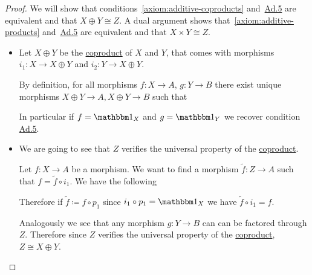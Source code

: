 \documentclass[../../main]{subfiles}
\begin{document}
\begin{proof}
  We will show that conditions~\ref{axiom:additive-coproducts} and~\hyperref[axiom:additive-morphisms]{Ad.5} are equivalent and that \(X \oplus Y \cong Z\).
  A dual argument shows that~\ref{axiom:additive-products} and~\hyperref[axiom:additive-morphisms]{Ad.5} are equivalent and that \(X \times Y \cong Z\).
  \begin{itemize}
    \item[{\ref{axiom:additive-coproducts} \(\implies\) \hyperref[axiom:additive-morphisms]{Ad.5}}] Let \(X \oplus Y\) be the \hyperref[def:categorical-coproduct]{coproduct} of \(X\) and \(Y\), that comes with morphisms \(i_{1}\colon X \to X \oplus Y\) and \(i_{2}\colon Y \to X \oplus Y\).

          By definition, for all morphisms \(f\colon X \to A\), \(g\colon Y \to B\) there exist unique morphisms \(X \oplus Y \to A, X \oplus Y \to B\) such that
          \begin{center}
          \end{center}
          In particular if \(f = \id_{X}\) and \(g = \id_{Y}\) we recover condition \hyperref[axiom:additive-morphisms]{Ad.5}.
    \item[{\hyperref[axiom:additive-morphisms]{Ad.5} \(\implies\) \ref{axiom:additive-coproducts}}] We are going to see that \(Z\) verifies the universal property of the \hyperref[def:categorical-coproduct]{coproduct}.

          Let \(f: X \to A\) be a morphism. We want to find a morphism \(\widetilde{f}\colon Z \to A\) such that \(f = \widetilde{f} \circ i_{1}\).
          We have the following
          \begin{center}
          \end{center}
          Therefore if \(\widetilde{f} \coloneq f \circ p_{1}\) since \(i_{1} \circ p_{1} = \id_{X}\) we have \(\widetilde{f} \circ i_{1} = f\).

          Analogously we see that any morphism \(g: Y \to B\) can can be factored through \(Z\).
          Therefore since \(Z\) verifies the universal property of the \hyperref[def:categorical-coproduct]{coproduct}, \(Z \cong X \oplus Y\). \qedhere
  \end{itemize}
\end{proof}
\end{document}
